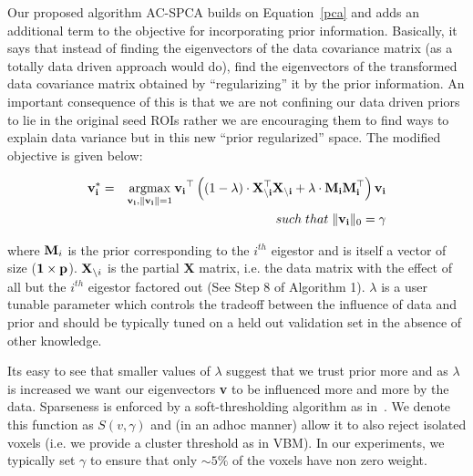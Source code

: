 \documentclass{article}
\newcommand{\argmax}{\operatornamewithlimits{argmax}}
\begin{document}
Our proposed algorithm AC-SPCA builds on Equation~\ref{pca} and adds an additional term to the objective for incorporating prior information. Basically, it says that instead of finding the eigenvectors of the data covariance matrix (as a totally data driven approach would do), find the eigenvectors of the transformed data covariance matrix obtained by ``regularizing'' it by the prior information. An important consequence of this is that we are not confining our data driven priors to lie in the original seed ROIs rather we are encouraging them to find ways to explain data variance but in this new ``prior regularized'' space. The modified objective is given below:

\begin{eqnarray}
\label{ppca}
{\bf v_i^*}&=& \argmax_{{\bf v_i},{\bf \|v_i\|}=1} {\bf v_i}^{\top}\left((1-\lambda)\cdot{\bf X^{\top}_{\backslash i}X_{\backslash i} +  \lambda\cdot M_iM_i^{\top}}\right){\bf v_i}  \\
\nonumber
&&such\;that\;\|{\bf v_i}\|_0=\gamma
\end{eqnarray}

where ${\bf M}_i$ is  the prior corresponding to the $i^{th}$ eigestor and is itself a vector of size (${\bf 1\times p}$). ${\bf X}_{\backslash i}$ is the partial {\bf X} matrix, i.e. the data matrix with the effect of all but the $i^{th}$ eigestor factored out (See Step 8 of Algorithm 1). $\lambda$ is a user tunable parameter which controls the tradeoff between the influence of data and prior and should be typically tuned on a held out validation set in the absence of other knowledge. 

Its easy to see that smaller values of $\lambda$ suggest that we trust prior more and as $\lambda$ is increased we want our eigenvectors {\bf v} to be influenced more and more by the data. Sparseness is enforced by a soft-thresholding algorithm as in~\citep{zou2006sparse,Witten2009b}. We denote this function as $S(v,\gamma)$ and (in an adhoc manner) allow it to also reject isolated voxels (i.e. we provide a cluster threshold as in VBM). In our experiments, we typically set $\gamma$ to ensure that only $\sim5\%$ of the voxels have non zero weight.
\end{document}
